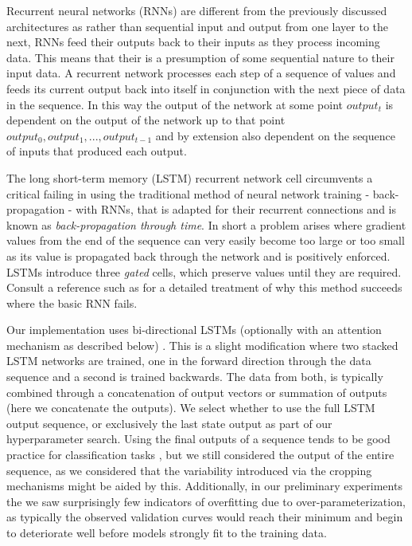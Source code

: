 \documentclass[utf8]{frontiersSCNS} %
\begin{document}
Recurrent neural networks (RNNs) are different from the previously discussed architectures as rather than sequential input and output from one layer to the next, RNNs feed their outputs back to their inputs as they process incoming data. This means that their is a presumption of some sequential nature to their input data. A recurrent network processes each step of a sequence of values and feeds its current output back into itself in conjunction with the next piece of data in the sequence. In this way the output of the network at some point $output_t$ is dependent on the output of the network up to that point $output_0, output_1, ..., output_{t-1}$ and by extension also dependent on the sequence of inputs that produced each output. 

The long short-term memory (LSTM) \cite{Hochreiter1997a} recurrent network cell circumvents a critical failing in using the traditional method of neural network training - back-propagation - with RNNs, that is adapted for their recurrent connections and is known as \emph{back-propagation through time}. In short a problem arises where gradient values from the end of the sequence can very easily become too large or too small as its value is propagated back through the network and is positively enforced. LSTMs introduce three \emph{gated} cells, which preserve values until they are required. Consult a reference such as \cite{GravesRNNBook} for a detailed treatment of why this method succeeds where the basic RNN fails.

Our implementation uses bi-directional LSTMs (optionally with an attention mechanism as described below) \cite{GravesRNNBook}. This is a slight modification where two stacked LSTM networks are trained, one in the forward direction through the data sequence and a second is trained backwards. The data from both, is typically combined through a concatenation of output vectors or summation of outputs (here we concatenate the outputs). We select whether to use the full LSTM output sequence, or exclusively the last state output as part of our hyperparameter search. Using the final outputs of a sequence tends to be good practice for classification tasks \cite{}, but we still considered the output of the entire sequence, as we considered that the variability introduced via the cropping mechanisms might be aided by this. Additionally, in our preliminary experiments the we saw surprisingly few indicators of overfitting due to over-parameterization, as typically the observed validation curves would reach their minimum and begin to deteriorate well before models strongly fit to the training data. 
\end{document}
